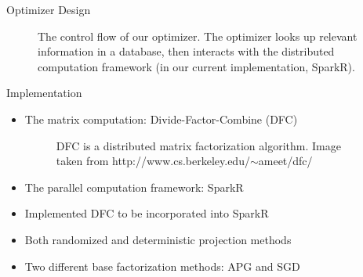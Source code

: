 \documentclass[final]{beamer}
\begin{document}
{\begin{frame}{}
\begin{center}
\begin{columns}[t]
\begin{column}{0.32\textwidth}
\begin{block}{\huge Optimizer Design}
\begin{center}
\begin{figure}
\caption[width=0.6\textwidth]{The control flow of our optimizer. The optimizer looks up relevant information in a database, then interacts with the distributed computation framework (in our current implementation, SparkR).}
\end{figure}
\end{center}




\end{block}

\vspace{1.5cm}

    \begin{block}{\huge Implementation}

\vspace{.5cm}
\begin{itemize}
\item The matrix computation: Divide-Factor-Combine (DFC)
\vspace{.2cm}
\begin{figure}
\caption[width=0.6\textwidth]{DFC is a distributed matrix factorization algorithm. Image taken from http://www.cs.berkeley.edu/$\sim$ameet/dfc/}
\end{figure}
\vspace{.2cm}
\item The parallel computation framework: SparkR
\item Implemented DFC to be incorporated into SparkR
\item Both randomized and deterministic projection methods
\item Two different base factorization methods: APG and SGD
\end{itemize}
\vspace{.5cm}


\end{block}
\end{column}
\end{columns}
\end{center}
\end{frame}}
\end{document}
